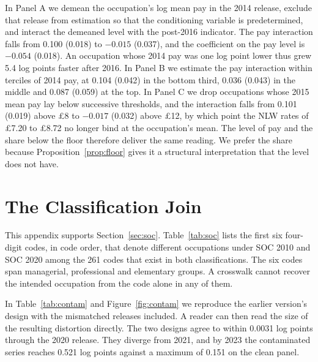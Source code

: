 \documentclass[12pt,leqno]{article}
\begin{document}


In Panel A we demean the occupation's log mean pay in the 2014 release, exclude that release from estimation so that the conditioning variable is predetermined, and interact the demeaned level with the post-2016 indicator. The pay interaction falls from 0.100 (0.018) to $-0.015$ (0.037), and the coefficient on the pay level is $-0.054$ (0.018). An occupation whose 2014 pay was one log point lower thus grew 5.4 log points faster after 2016. In Panel B we estimate the pay interaction within terciles of 2014 pay, at 0.104 (0.042) in the bottom third, 0.036 (0.043) in the middle and 0.087 (0.059) at the top. In Panel C we drop occupations whose 2015 mean pay lay below successive thresholds, and the interaction falls from 0.101 (0.019) above \pounds 8 to $-0.017$ (0.032) above \pounds 12, by which point the NLW rates of \pounds 7.20 to \pounds 8.72 no longer bind at the occupation's mean. The level of pay and the share below the floor therefore deliver the same reading. We prefer the share because Proposition~\ref{prop:floor} gives it a structural interpretation that the level does not have.

\section{The Classification Join}\label{app:soc}

This appendix supports Section~\ref{sec:soc}. Table~\ref{tab:soc} lists the first six four-digit codes, in code order, that denote different occupations under SOC 2010 and SOC 2020 among the 261 codes that exist in both classifications. The six codes span managerial, professional and elementary groups. A crosswalk cannot recover the intended occupation from the code alone in any of them.



In Table~\ref{tab:contam} and Figure~\ref{fig:contam} we reproduce the earlier version's design with the mismatched releases included. A reader can then read the size of the resulting distortion directly. The two designs agree to within 0.0031 log points through the 2020 release. They diverge from 2021, and by 2023 the contaminated series reaches 0.521 log points against a maximum of 0.151 on the clean panel.


\end{document}
